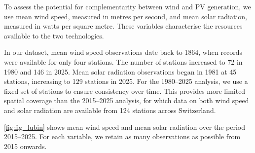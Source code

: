 \documentclass[11pt,a4paper]{article}
\begin{document}
To assess the potential for complementarity between wind and PV generation, we use mean wind speed, measured in metres per second, and mean solar radiation, measured in watts per square metre. These variables characterise the resources available to the two technologies.

In our dataset, mean wind speed observations date back to 1864, when records were available for only four stations. The number of stations increased to 72 in 1980 and 146 in 2025. Mean solar radiation observations began in 1981 at 45 stations, increasing to 129 stations in 2025. For the 1980--2025 analysis, we use a fixed set of stations to ensure consistency over time. This provides more limited spatial coverage than the 2015--2025 analysis, for which data on both wind speed and solar radiation are available from 124 stations across Switzerland.

\autoref{fig:fig_lubin} shows mean wind speed and mean solar radiation over the period 2015--2025. For each variable, we retain as many observations as possible from 2015 onwards.
\end{document}

